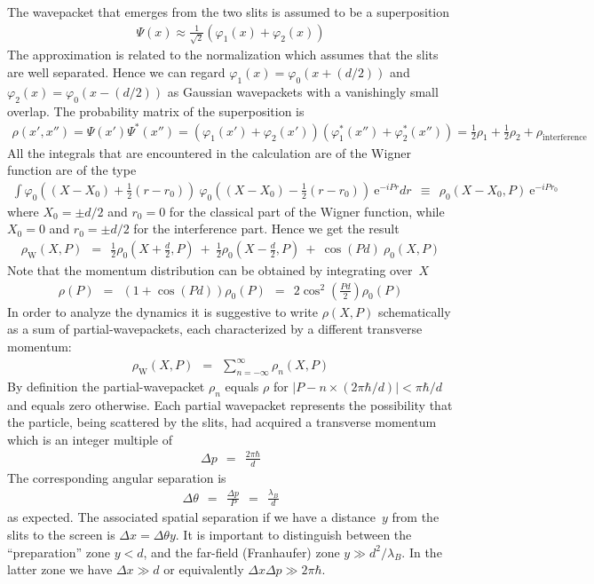 \documentclass[onecolumn,fleqn, 11pt]{revtex4}
\newcommand{\eexp}{\mathrm{e}^}
\newcommand{\tbox}[1]{\text{#1}}
\newcommand{\beq}{\begin{eqnarray}}
\newcommand{\eeq}{\end{eqnarray}}
\begin{document}
The wavepacket that emerges from the 
two slits is assumed to be a superposition 
\beq
\Psi(x) \approx \frac{1}{\sqrt{2}} (\varphi_1(x)+\varphi_2(x)) 
\eeq
The approximation is related to the normalization 
which assumes that the slits are well separated.
Hence we can regard ${ \varphi_1(x) = \varphi_0(x+(d/2)) }$  
and ${ \varphi_2(x) = \varphi_0(x-(d/2)) }$
as Gaussian wavepackets with a vanishingly small overlap. 
The probability matrix of the superposition is 
\beq
\rho(x',x'')
= \Psi(x')\Psi^*(x'') 
= (\varphi_1(x')+\varphi_2(x'))(\varphi_1^*(x'')+\varphi_2^*(x''))
=\frac{1}{2}\rho_1+\frac{1}{2}\rho_2+\rho_{\tbox{interference}}
\eeq
All the integrals that are encountered in the calculation are 
of the Wigner function are of the type 
\beq
\int 
\varphi_0\left((X-X_0)+\frac{1}{2}(r-r_0)\right) 
\ \varphi_0\left((X-X_0)-\frac{1}{2}(r-r_0)\right) 
\ \eexp{-iPr} dr 
\ \ \equiv \ \ 
\rho_0(X-X_0,P) \ \eexp{-iPr_0}  
\eeq 
where $X_0=\pm d/2$  and $r_0=0$ for the 
classical part of the Wigner function, 
while $X_0=0$ and  $r_0=\pm d/2$ 
for the interference part.  
Hence we get the result   
\beq
\rho_{\tbox{W}}(X,P)
\ \ = \ \ \frac{1}{2}\rho_0\left(X+\frac{d}{2},P\right)
\ + \ \frac{1}{2}\rho_0\left(X-\frac{d}{2},P\right)
\ + \ \cos(Pd) \ \rho_0(X,P)
\eeq
Note that the momentum distribution can be obtained by integrating over~$X$
\beq
\rho(P) \ \ = \ \ (1+\cos(Pd)) \rho_0(P) \ \ = \ \ 2\cos^2(\frac{Pd}{2})\rho_0(P)
\eeq
In order to analyze the dynamics it is suggestive to write $\rho(X,P)$ 
schematically as a sum of partial-wavepackets, each characterized   
by a different transverse momentum:
\beq
\rho_{\tbox{W}}(X,P) \ \ = \ \ \sum_{n=-\infty}^{\infty} \rho_{n}(X,P)
\eeq
By definition the partial-wavepacket $\rho_{n}$  
equals $\rho$ for $|P-n\times(2\pi\hbar/d)| < \pi\hbar/d$ 
and equals zero otherwise. Each partial wavepacket 
represents the possibility that the particle, being 
scattered by the slits,  
had acquired a transverse momentum which is 
an integer multiple of 
\beq
\Delta p \ \ = \ \ \frac{2\pi\hbar}{d}
\eeq
The corresponding angular separation is 
\beq
\Delta\theta \ \ = \ \ \frac{\Delta p}{P} \ \ = \ \ \frac{\lambda_B}{d}
\eeq
as expected. The associated spatial separation 
if we have a distance~$y$ from the slits to the screen 
is ${\Delta x = \Delta\theta y}$. 
It is important to distinguish between the 
``preparation'' zone $y<d$, and the far-field 
(Franhaufer) zone $y \gg d^2/\lambda_B$.  
In the latter zone we have ${\Delta x \gg d}$ 
or equivalently ${\Delta x\Delta p \gg 2\pi\hbar}$.
\end{document}

